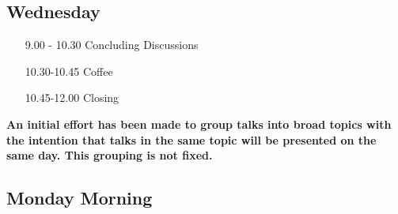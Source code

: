 \documentclass{article}
\begin{document}
\subsection*{Wednesday}

\begin{itemize}
	\item[9.00 - 10.30] Concluding Discussions
	\item[10.30-10.45] Coffee
	\item[10.45-12.00] Closing
\end{itemize}

\newpage

\vspace{1em}\noindent
\textbf{\color{red}An initial effort has been made to group talks into broad topics with the intention that talks in the same topic will be presented on the same day. This grouping is not fixed.}

\subsection*{Monday Morning}
\end{document}
